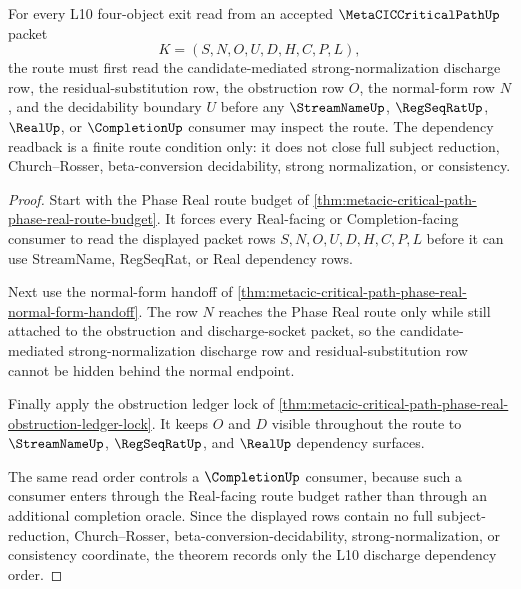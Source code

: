 \begin{theorem}
\label{thm:metacic-critical-path-l10-discharge-dependency-readback}
For every L10 four-object exit read from an accepted $\MetaCICCriticalPathUp$ packet
$$
K=(S,N,O,U,D,H,C,P,L),
$$
the route must first read the candidate-mediated strong-normalization discharge row, the residual-substitution row, the obstruction row $O$, the normal-form row $N$, and the decidability boundary $U$ before any $\StreamNameUp$, $\RegSeqRatUp$, $\RealUp$, or $\CompletionUp$ consumer may inspect the route. The dependency readback is a finite route condition only: it does not close full subject reduction, Church--Rosser, beta-conversion decidability, strong normalization, or consistency.
\end{theorem}
\begin{proof}
Start with the Phase Real route budget of \autoref{thm:metacic-critical-path-phase-real-route-budget}. It forces every Real-facing or Completion-facing consumer to read the displayed packet rows $S,N,O,U,D,H,C,P,L$ before it can use StreamName, RegSeqRat, or Real dependency rows.

Next use the normal-form handoff of \autoref{thm:metacic-critical-path-phase-real-normal-form-handoff}. The row $N$ reaches the Phase Real route only while still attached to the obstruction and discharge-socket packet, so the candidate-mediated strong-normalization discharge row and residual-substitution row cannot be hidden behind the normal endpoint.

Finally apply the obstruction ledger lock of \autoref{thm:metacic-critical-path-phase-real-obstruction-ledger-lock}. It keeps $O$ and $D$ visible throughout the route to $\StreamNameUp$, $\RegSeqRatUp$, and $\RealUp$ dependency surfaces.

The same read order controls a $\CompletionUp$ consumer, because such a consumer enters through the Real-facing route budget rather than through an additional completion oracle. Since the displayed rows contain no full subject-reduction, Church--Rosser, beta-conversion-decidability, strong-normalization, or consistency coordinate, the theorem records only the L10 discharge dependency order.
\end{proof}
